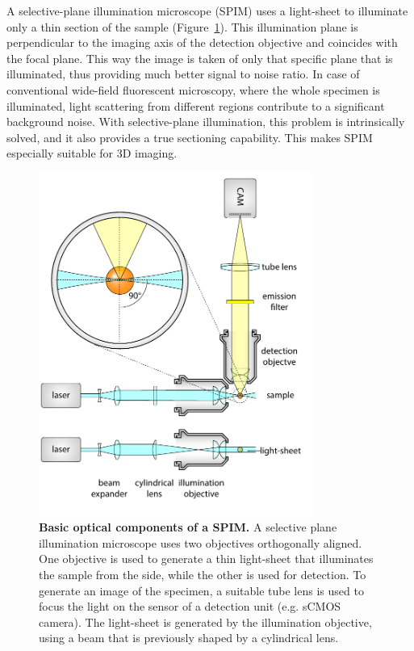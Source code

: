 \documentclass{diploma_style}
\begin{document}
A selective-plane illumination microscope (SPIM) uses a light-sheet to illuminate only a thin section of the sample (Figure~\ref{fig:light-sheet}). This illumination plane is perpendicular to the imaging axis of the detection objective and coincides with the focal plane. This way the image is taken of only that specific plane that is illuminated, thus providing much better signal to noise ratio. In case of conventional wide-field fluorescent microscopy, where the whole specimen is illuminated, light scattering from different regions contribute to a significant background noise. With selective-plane illumination, this problem is intrinsically solved, and it also provides a true sectioning capability. This makes SPIM especially suitable for 3D imaging.



\begin{figure}[htpb]
	\centering
	\includegraphics[page=1,width=0.8\textwidth]{figures/1_spim/spim_cyl}
	\caption{\textbf{Basic optical components of a SPIM.} A selective plane illumination microscope uses two objectives orthogonally aligned. One objective is used to generate a thin light-sheet that illuminates the sample from the side, while the other is used for detection. To generate an image of the specimen, a suitable tube lens is used to focus the light on the sensor of a detection unit (e.g. sCMOS camera). The light-sheet is generated by the illumination objective, using a beam that is previously shaped by a cylindrical lens.}
	\label{fig:light-sheet}
\end{figure}
\end{document}
